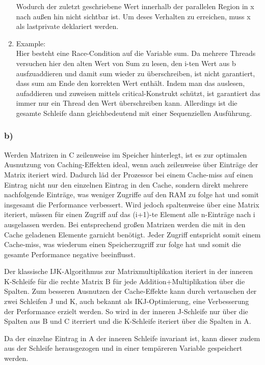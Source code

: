 \documentclass{report}
\begin{document}
\begin{enumerate}
				Wodurch der zuletzt geschriebene Wert innerhalb der parallelen Region in x nach außen hin nicht sichtbar ist.
				Um deses Verhalten zu erreichen, muss x als lastprivate deklariert werden.
			\item Example: \\
				Hier besteht eine Race-Condition auf die Variable sum. 
				Da mehrere Threads versuchen hier den alten Wert von Sum zu lesen, den i-ten Wert aus b ausfzuaddieren und damit sum wieder zu überschreiben, ist nicht garantiert, dass sum am Ende den korrekten Wert enthält.
				Indem man das auslesen, aufaddieren und zuweisen mittels critical-Konstrukt schützt, ist garantiert das immer nur ein Thread den Wert überschreiben kann.
				Allerdings ist die gesamte Schleife dann gleichbedeutend mit einer Sequenziellen Ausführung.
		\end{enumerate}

		\subsubsection{b)}
			Werden Matrizen in C zeilenweise im Speicher hinterlegt, ist es zur optimalen Ausnutzung von Caching-Effekten ideal, wenn auch zeilenweise über Einträge der Matrix iteriert wird.
			Dadurch läd der Prozessor bei einem Cache-miss auf einen Eintrag nicht nur den einzelnen Eintrag in den Cache, sondern direkt mehrere nachfolgende Einträge, was weniger Zugriffe auf den RAM zu folge hat und somit insgesamt die Performance verbessert.
			Wird jedoch spaltenweise über eine Matrix iteriert, müssen für einen Zugriff auf das (i+1)-te Element alle n-Einträge nach i ausgelassen werden. 
			Bei entsprechend großen Matrizen werden die mit in den Cache geladenen Elemente garnicht benötigt.
			Jeder Zugriff entspricht somit einem Cache-miss, was wiederum einen Speicherzugriff zur folge hat und somit die gesamte Performance negative beeinflusst.
			
			Der klassische IJK-Algorithmus zur Matrixmultiplikation iteriert in der inneren K-Schleife für die rechte Matrix B für jede Addition+Multiplikation über die Spalten.
			Zum besseren Ausnutzen der Cache-Effekte kann durch vertauschen der zwei Schleifen J und K, auch bekannt als IKJ-Optimierung, eine Verbesserung der Performance erzielt werden.
			So wird in der inneren J-Schleife nur über die Spalten aus B und C iterriert und die K-Schleife iteriert über die Spalten in A.

			Da der einzelne Eintrag in A der inneren Schleife invariant ist, kann dieser zudem aus der Schleife herausgezogen und in einer tempäreren Variable gespeichert werden.
\end{document}

